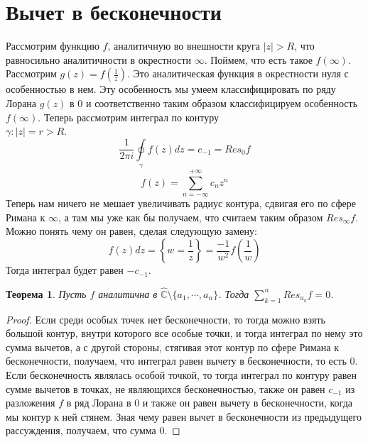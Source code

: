 \documentclass[12pt,a4paper]{article} %
\newtheorem{theorem}{Теорема}
\newcommand{\Co}{\mathbb{C}}
\begin{document}
	\section{Вычет в бесконечности}
	Рассмотрим функцию $f$, аналитичную во внешности круга $|z|>R$, что равносильно аналитичности в окрестности $\infty$. Поймем, что есть такое $f(\infty)$. Рассмотрим $g(z)=f(\frac{1}{z})$. Это аналитическая функция в окрестности нуля с особенностью в нем. Эту особенность мы умеем классифицировать по ряду Лорана $g(z)$ в 0 и соответственно таким образом классифицируем особенность $f(\infty)$. Теперь рассмотрим интеграл по контуру \\$\gamma :|z|=r>R$.
	$$\displaystyle\frac{1}{2\pi i}\oint\limits_{\gamma}f(z)dz=c_{-1}=Res_0f$$
	$$f(z)=\displaystyle\sum_{n=-\infty}^{+\infty}c_n z^n$$
	Теперь нам ничего не мешает увеличивать радиус контура, сдвигая его по сфере Римана к $\infty$, а там мы уже как бы получаем, что считаем таким образом $Res_{\infty}f$. Можно понять чему он равен, сделая следующую замену:
	$$f(z)dz=\displaystyle\left\{w=\frac{1}{z}\right\}=\frac{-1}{w^2}f\left(\frac{1}{w}\right)$$
	Тогда интеграл будет равен $-c_{-1}$.
	\begin{theorem}
		Пусть $f$ аналитична в $\widehat{\Co}\setminus\{a_1,\cdots,a_n\}$. Тогда $\displaystyle\sum_{k=1}^nRes_{a_k}f=0$.
	\end{theorem}
	\begin{proof}
		Если среди особых точек нет бесконечности, то тогда можно взять большой контур, внутри которого все особые точки, и тогда интеграл по нему это сумма вычетов, а с другой стороны, стягивая этот контур по сфере Римана к бесконечности, получаем, что интеграл равен вычету в бесконечности, то есть 0. Если бесконечность являлась особой точкой, то тогда интеграл по контуру равен сумме вычетов в точках, не являющихся бесконечностью, также он равен $c_{-1}$ из разложения $f$ в ряд Лорана в 0 и также он равен вычету в бесконечности, когда мы контур к ней стянем. Зная чему равен вычет в бесконечности из предыдущего рассуждения, получаем, что сумма 0.
	\end{proof}
\end{document}
